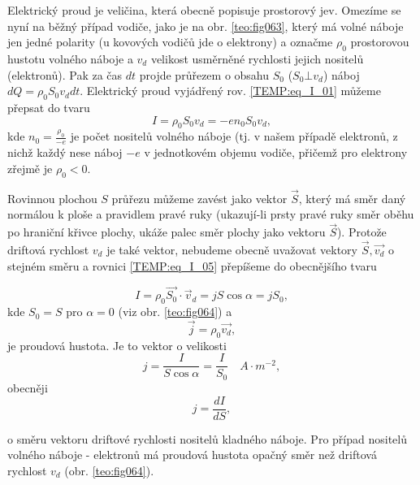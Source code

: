       Elektrický proud je veličina, která obecně popisuje prostorový jev. Omezíme se nyní na běžný
      případ vodiče, jako je na obr. \ref{teo:fig063}, který má volné náboje jen jedné polarity (u
      kovových vodičů jde o elektrony) a označme $\rho_0$ prostorovou hustotu volného náboje a $v_d$
      velikost usměrněné rychlosti jejich nositelů (elektronů). Pak za čas $dt$ projde průřezem o
      obsahu $S_0$ ($S_0\bot v_d$) náboj $dQ = \rho_0 S_0 v_d dt$. Elektrický proud vyjádřený rov.
      \ref{TEMP:eq_I_01} můžeme přepsat do tvaru
        \begin{equation}\label{TEMP:eq_I_05}
          I = \rho_0 S_0 v_d = - e n_0 S_0 v_d, 
        \end{equation}         
      kde $\displaystyle{n_0 = \frac{\rho_0}{-e}}$ je počet nositelů volného náboje (tj. v našem
      případě elektronů, z nichž každý nese náboj $-e$ v jednotkovém objemu vodiče, přičemž pro
      elektrony zřejmě je $\rho_0<0$.

      Rovinnou plochou $S$ průřezu můžeme zavést jako vektor $\vec{S}$, který má směr daný normálou
      k ploše a pravidlem pravé ruky (ukazují-li prsty pravé ruky směr oběhu po hraniční křivce
      plochy, ukáže palec směr plochy jako vektoru $\vec{S}$). Protože driftová rychlost $v_d$ je
      také vektor, nebudeme obecně uvažovat vektory $\vec{S}, \vec{v_d}$ o stejném směru a rovnici
      \ref{TEMP:eq_I_05} přepíšeme do obecnějšího tvaru
      
      \begin{equation}\label{TEMP:eq_I_06}
        I = \rho_0 \vec{S_0}\cdot\vec{v}_d = jS\cos\alpha = jS_0, 
      \end{equation}      
      kde $S_0 = S$ pro $\alpha = 0$ (viz obr. \ref{teo:fig064}) a  
      \begin{equation}\label{TEMP:eq_I_07}
        \vec{j} = \rho_0\vec{v_d}, 
      \end{equation}        
      je proudová hustota. Je to vektor o velikosti
      \begin{equation}\label{TEMP:eq_I_08}
        j = \frac{I}{S\cos\alpha} = \frac{I}{S_0}  \quad A\cdot m^{-2}, 
      \end{equation}   
      obecněji
      \begin{equation}\label{TEMP:eq_I_09}
        j = \frac{dI}{dS}, 
      \end{equation}

      o směru vektoru driftové rychlosti nositelů kladného náboje. Pro případ nositelů volného
      náboje - elektronů má proudová hustota opačný směr než driftová rychlost $v_d$ (obr.
      \ref{teo:fig064}).
      
